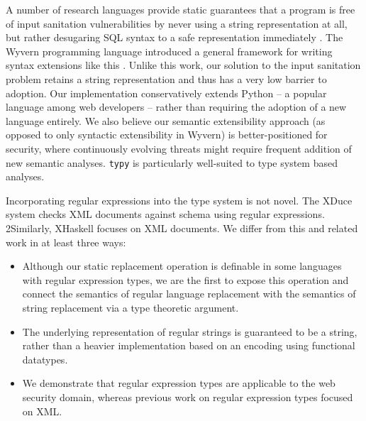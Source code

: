 \documentclass[10pt]{sigplanconf}
\theoremstyle{definition}
\begin{document}
A number of research languages provide static guarantees that a program is free of input sanitation vulnerabilities by never using a string representation at all, but rather desugaring SQL syntax to a safe representation immediately \cite{UrFlowOSDI10}. The Wyvern programming language introduced a general framework for writing syntax extensions like this \cite{tsl}.
Unlike this work, our solution to the input sanitation problem retains a string representation and thus has a very low barrier to adoption. Our implementation conservatively extends Python -- a popular language among web developers -- rather than requiring the adoption of a new language entirely.
We also believe our semantic extensibility approach (as opposed to only syntactic extensibility in Wyvern) is better-positioned for security, where continuously evolving threats might require frequent addition of new semantic  analyses. \verb|typy| is particularly well-suited to type system based analyses. 


Incorporating regular expressions into the type system is not novel. The XDuce system \cite{HosoyaVouillonPierce2000ICFP} checks XML documents against schema using regular expressions. 
2Similarly, XHaskell \cite{xhaskell} focuses on XML documents.
We differ from this and related work in at least three ways:
\begin{itemize}
  \item Although our static replacement operation is definable in some languages with regular expression types, we are the first to expose this operation and connect the semantics of regular language replacement with the semantics of string replacement via a type theoretic argument.
  \item The underlying representation of regular strings is guaranteed to be a string, rather than a heavier implementation based on an encoding using functional datatypes.
  \item We demonstrate that regular expression types are applicable to the web security domain, whereas previous work on regular expression types focused on XML.
\end{itemize}
\end{document}

